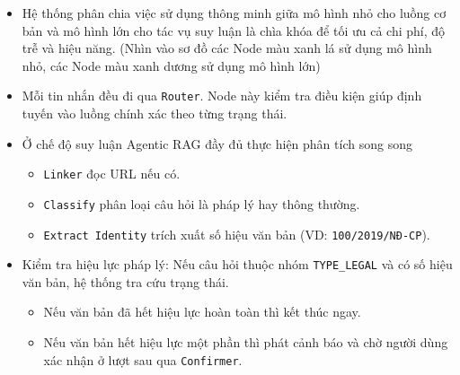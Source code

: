 \begin{itemize}
\item Hệ thống
phân chia việc sử dụng thông minh
giữa mô hình nhỏ cho luồng cơ bản
và mô hình lớn cho tác vụ suy luận
là chìa khóa để tối ưu cả chi phí, độ trễ và hiệu năng.
(Nhìn vào sơ đồ các Node màu xanh lá sử dụng mô hình nhỏ,
các Node màu xanh dương sử dụng mô hình lớn)

\item Mỗi tin nhắn đều đi qua \texttt{Router}.
Node này kiểm tra điều kiện
giúp định tuyến vào luồng chính xác
theo từng trạng thái.

\item Ở chế độ suy luận Agentic RAG đầy đủ
thực hiện
phân tích song song

\begin{itemize}

\item \texttt{Linker} đọc URL nếu có.
\item \texttt{Classify} phân loại câu hỏi là pháp lý hay thông thường.
\item \texttt{Extract Identity} trích xuất số hiệu văn bản (VD: \texttt{100/2019/NĐ-CP}).

\end{itemize}

\item Kiểm tra hiệu lực pháp lý:
Nếu câu hỏi thuộc nhóm \texttt{TYPE\_LEGAL} và có số hiệu văn bản,
hệ thống tra cứu trạng thái.

\begin{itemize}

\item Nếu văn bản đã hết hiệu lực hoàn toàn
thì kết thúc ngay.
\item Nếu văn bản hết hiệu lực một phần
thì phát cảnh báo và chờ người dùng xác nhận ở lượt sau qua \texttt{Confirmer}.

\end{itemize}



\end{itemize}
